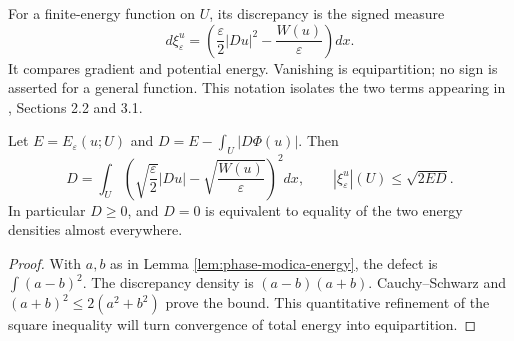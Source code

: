 \begin{definition}\label{def:phase-discrepancy}
For a finite-energy function on $U$, its discrepancy is the signed measure
\[
 d\xi_\varepsilon^u=
 \left(\frac\varepsilon2|Du|^2-\frac{W(u)}\varepsilon\right)dx.
\]
It compares gradient and potential energy. Vanishing is equipartition; no sign is asserted for a general function. This notation isolates the two terms appearing in \cite{ChAC}, Sections 2.2 and 3.1.
\end{definition}

\begin{proposition}\label{prop:phase-defect}
Let $E=E_\varepsilon(u;U)$ and $D=E-\int_U|D\Phi(u)|$. Then
\[
 D=\int_U\left(\sqrt{\frac\varepsilon2}|Du|-\sqrt{\frac{W(u)}\varepsilon}\right)^2dx,
 \qquad |\xi_\varepsilon^u|(U)\leq\sqrt{2ED}.
\]
In particular $D\geq0$, and $D=0$ is equivalent to equality of the two energy densities almost everywhere.
\end{proposition}
\begin{proof}
With $a,b$ as in Lemma \ref{lem:phase-modica-energy}, the defect is $\int(a-b)^2$. The discrepancy density is $(a-b)(a+b)$. Cauchy--Schwarz and $(a+b)^2\leq2(a^2+b^2)$ prove the bound. This quantitative refinement of the square inequality will turn convergence of total energy into equipartition.
\end{proof}
